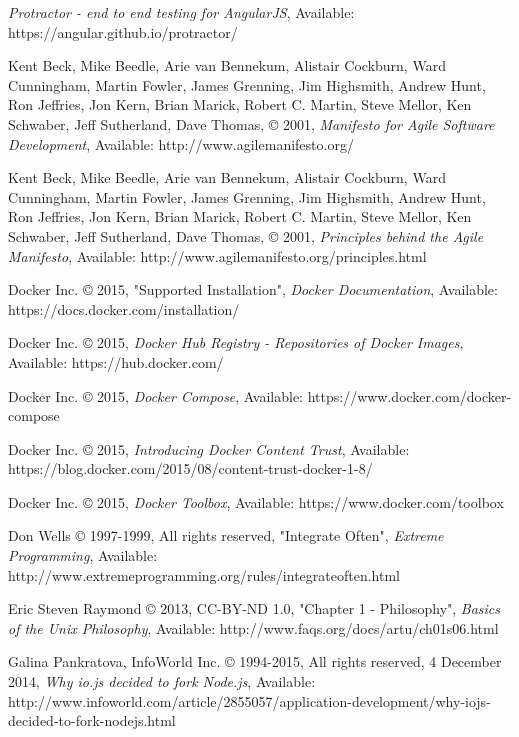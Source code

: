 \begin{thebibliography}{999}

\raggedright
{\em Protractor - end to end testing for AngularJS},
Available: https://angular.github.io/protractor/

\raggedright
Kent Beck, Mike Beedle, Arie van Bennekum, Alistair Cockburn, Ward Cunningham,
Martin Fowler, James Grenning, Jim Highsmith, Andrew Hunt, Ron Jeffries, Jon
Kern, Brian Marick, Robert C. Martin, Steve Mellor, Ken Schwaber, Jeff
Sutherland, Dave Thomas, © 2001,
{\em Manifesto for Agile Software Development},
Available: http://www.agilemanifesto.org/

\raggedright
Kent Beck, Mike Beedle, Arie van Bennekum, Alistair Cockburn, Ward Cunningham,
Martin Fowler, James Grenning, Jim Highsmith, Andrew Hunt, Ron Jeffries, Jon
Kern, Brian Marick, Robert C. Martin, Steve Mellor, Ken Schwaber, Jeff
Sutherland, Dave Thomas, © 2001,
{\em Principles behind the Agile Manifesto},
Available: http://www.agilemanifesto.org/principles.html

Docker Inc. © 2015, "Supported Installation",
{\em Docker Documentation},
Available: https://docs.docker.com/installation/

Docker Inc. © 2015,
{\em Docker Hub Registry - Repositories of Docker Images},
Available: https://hub.docker.com/

\raggedright
Docker Inc. © 2015,
{\em Docker Compose},
Available: https://www.docker.com/docker-compose

\raggedright
Docker Inc. © 2015,
{\em Introducing Docker Content Trust},
Available: https://blog.docker.com/2015/08/content-trust-docker-1-8/

\raggedright
Docker Inc. © 2015,
{\em Docker Toolbox},
Available: https://www.docker.com/toolbox

\raggedright
Don Wells © 1997-1999, All rights reserved, "Integrate Often",
{\em Extreme Programming},
Available: http://www.extremeprogramming.org/rules/integrateoften.html

\raggedright
Eric Steven Raymond © 2013, CC-BY-ND 1.0, "Chapter 1 - Philosophy",
{\em Basics of the Unix Philosophy},
Available: http://www.faqs.org/docs/artu/ch01s06.html

\raggedright
Galina Pankratova, InfoWorld Inc. © 1994-2015, All rights reserved, 4 December 2014,
{\em Why io.js decided to fork Node.js},
Available: http://www.infoworld.com/article/2855057/application-development/why-iojs-decided-to-fork-nodejs.html


\end{thebibliography}
